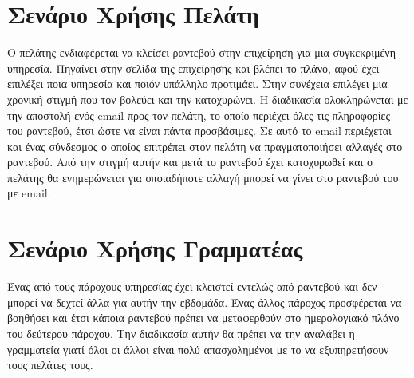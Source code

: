 \section{Σενάριο Χρήσης Πελάτη}
Ο πελάτης ενδιαφέρεται να κλείσει ραντεβού στην επιχείρηση για μια συγκεκριμένη υπηρεσία. Πηγαίνει στην σελίδα της επιχείρησης και βλέπει το πλάνο, αφού έχει επιλέξει ποια υπηρεσία και ποιόν υπάλληλο προτιμάει. Στην συνέχεια επιλέγει μια χρονική στιγμή που τον βολεύει και την κατοχυρώνει. Η διαδικασία ολοκληρώνεται με την αποστολή ενός email προς τον πελάτη, το οποίο περιέχει όλες τις πληροφορίες του ραντεβού, έτσι ώστε να είναι πάντα προσβάσιμες. Σε αυτό το email περιέχεται και ένας σύνδεσμος ο οποίος επιτρέπει στον πελάτη να πραγματοποιήσει αλλαγές στο ραντεβού. Από την στιγμή αυτήν και μετά το ραντεβού έχει κατοχυρωθεί και ο πελάτης θα ενημερώνεται για οποιαδήποτε αλλαγή μπορεί να γίνει στο ραντεβού του με email.

\section{Σενάριο Χρήσης Γραμματέας}
Ένας από τους πάροχους υπηρεσίας έχει κλειστεί εντελώς από ραντεβού και δεν μπορεί να δεχτεί άλλα για αυτήν την εβδομάδα. Ένας άλλος πάροχος προσφέρεται να βοηθήσει και έτσι κάποια ραντεβού πρέπει να μεταφερθούν στο ημερολογιακό πλάνο του δεύτερου πάροχου. Την διαδικασία αυτήν θα πρέπει να την αναλάβει η γραμματεία γιατί όλοι οι άλλοι είναι πολύ απασχολημένοι με το να εξυπηρετήσουν τους πελάτες τους.